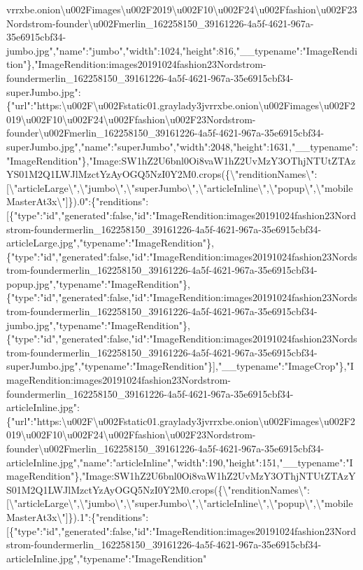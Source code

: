 vrrxbe.onion\textbackslash{}u002Fimages\textbackslash{}u002F2019\textbackslash{}u002F10\textbackslash{}u002F24\textbackslash{}u002Ffashion\textbackslash{}u002F23Nordstrom-founder\textbackslash{}u002Fmerlin\_162258150\_39161226-4a5f-4621-967a-35e6915cbf34-jumbo.jpg","name":"jumbo","width":1024,"height":816,"\_\_typename":"ImageRendition"\},"ImageRendition:images20191024fashion23Nordstrom-foundermerlin\_162258150\_39161226-4a5f-4621-967a-35e6915cbf34-superJumbo.jpg":\{"url":"https:\textbackslash{}u002F\textbackslash{}u002Fstatic01.graylady3jvrrxbe.onion\textbackslash{}u002Fimages\textbackslash{}u002F2019\textbackslash{}u002F10\textbackslash{}u002F24\textbackslash{}u002Ffashion\textbackslash{}u002F23Nordstrom-founder\textbackslash{}u002Fmerlin\_162258150\_39161226-4a5f-4621-967a-35e6915cbf34-superJumbo.jpg","name":"superJumbo","width":2048,"height":1631,"\_\_typename":"ImageRendition"\},"Image:SW1hZ2U6bnl0Oi8vaW1hZ2UvMzY3OThjNTUtZTAzYS01M2Q1LWJlMzctYzAyOGQ5NzI0Y2M0.crops(\{\textbackslash{}"renditionNames\textbackslash{}":{[}\textbackslash{}"articleLarge\textbackslash{}",\textbackslash{}"jumbo\textbackslash{}",\textbackslash{}"superJumbo\textbackslash{}",\textbackslash{}"articleInline\textbackslash{}",\textbackslash{}"popup\textbackslash{}",\textbackslash{}"mobileMasterAt3x\textbackslash{}"{]}\}).0":\{"renditions":{[}\{"type":"id","generated":false,"id":"ImageRendition:images20191024fashion23Nordstrom-foundermerlin\_162258150\_39161226-4a5f-4621-967a-35e6915cbf34-articleLarge.jpg","typename":"ImageRendition"\},\{"type":"id","generated":false,"id":"ImageRendition:images20191024fashion23Nordstrom-foundermerlin\_162258150\_39161226-4a5f-4621-967a-35e6915cbf34-popup.jpg","typename":"ImageRendition"\},\{"type":"id","generated":false,"id":"ImageRendition:images20191024fashion23Nordstrom-foundermerlin\_162258150\_39161226-4a5f-4621-967a-35e6915cbf34-jumbo.jpg","typename":"ImageRendition"\},\{"type":"id","generated":false,"id":"ImageRendition:images20191024fashion23Nordstrom-foundermerlin\_162258150\_39161226-4a5f-4621-967a-35e6915cbf34-superJumbo.jpg","typename":"ImageRendition"\}{]},"\_\_typename":"ImageCrop"\},"ImageRendition:images20191024fashion23Nordstrom-foundermerlin\_162258150\_39161226-4a5f-4621-967a-35e6915cbf34-articleInline.jpg":\{"url":"https:\textbackslash{}u002F\textbackslash{}u002Fstatic01.graylady3jvrrxbe.onion\textbackslash{}u002Fimages\textbackslash{}u002F2019\textbackslash{}u002F10\textbackslash{}u002F24\textbackslash{}u002Ffashion\textbackslash{}u002F23Nordstrom-founder\textbackslash{}u002Fmerlin\_162258150\_39161226-4a5f-4621-967a-35e6915cbf34-articleInline.jpg","name":"articleInline","width":190,"height":151,"\_\_typename":"ImageRendition"\},"Image:SW1hZ2U6bnl0Oi8vaW1hZ2UvMzY3OThjNTUtZTAzYS01M2Q1LWJlMzctYzAyOGQ5NzI0Y2M0.crops(\{\textbackslash{}"renditionNames\textbackslash{}":{[}\textbackslash{}"articleLarge\textbackslash{}",\textbackslash{}"jumbo\textbackslash{}",\textbackslash{}"superJumbo\textbackslash{}",\textbackslash{}"articleInline\textbackslash{}",\textbackslash{}"popup\textbackslash{}",\textbackslash{}"mobileMasterAt3x\textbackslash{}"{]}\}).1":\{"renditions":{[}\{"type":"id","generated":false,"id":"ImageRendition:images20191024fashion23Nordstrom-foundermerlin\_162258150\_39161226-4a5f-4621-967a-35e6915cbf34-articleInline.jpg","typename":"ImageRendition"\